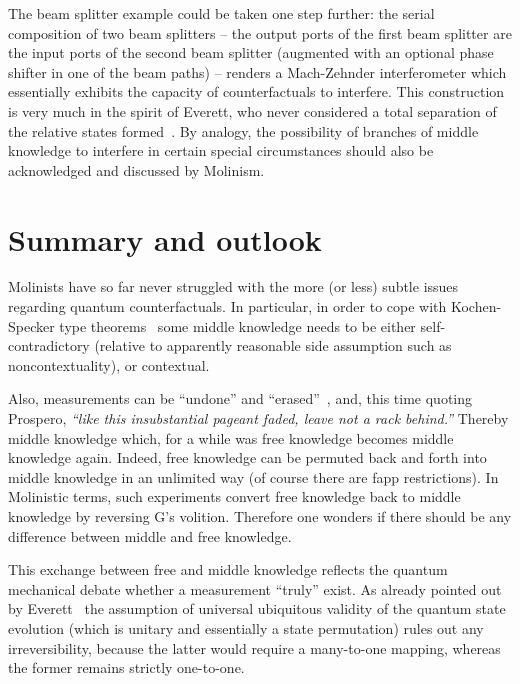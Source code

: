 \documentclass[%
  twocolumn,
 showpacs,
 showkeys,
 preprintnumbers,
 amsmath,amssymb,
 aps,
  pra,
  longbibliography,
 ]{revtex4-1}
\begin{document}
The beam splitter example could be taken one step further: the serial composition of two beam splitters
--
the output ports of the first beam splitter are the input ports of the second beam splitter
(augmented with an optional phase shifter in one of the beam paths)
--
renders a Mach-Zehnder interferometer which essentially exhibits the capacity of
counterfactuals to interfere. This construction is very much in the spirit of Everett,
who never considered a total separation of the relative states
formed~\cite{sep-qm-everett}.
By analogy, the possibility of branches of middle knowledge to interfere in certain special circumstances should also be acknowledged and discussed by Molinism.




\section{Summary and outlook}

Molinists have so far never struggled with the more (or less) subtle issues regarding quantum counterfactuals.
In particular, in order to cope with Kochen-Specker type theorems~\cite{kochen1,peres222,pitowsky:218,2015-AnalyticKS}
some middle knowledge needs to be either self-contradictory (relative to apparently reasonable side assumption such as noncontextuality),
or contextual.

Also, measurements can be ``undone'' and
``erased''~\cite{PhysRevD.22.879,PhysRevA.25.2208,greenberger2,Nature351,Zajonc-91,PhysRevA.45.7729,PhysRevLett.73.1223,PhysRevLett.75.3783,hkwz},
and, this time quoting Prospero, {\em ``like this insubstantial pageant faded,
leave not a rack behind.''}
Thereby middle knowledge which, %
for a while was free knowledge becomes middle knowledge again.
Indeed, free knowledge can be permuted back and forth into middle knowledge in an unlimited way (of course there are fapp restrictions).
In Molinistic terms, such experiments convert free knowledge back to middle knowledge by reversing G's volition.
Therefore one wonders if there should be any difference between middle and free knowledge.

This exchange between free and middle knowledge reflects the quantum mechanical debate whether  a measurement ``truly'' exist.
As already pointed out by Everett~\cite{everett}
the assumption of universal ubiquitous validity of the quantum state evolution (which is unitary and essentially a state permutation)
rules out any irreversibility, because the latter would require a many-to-one mapping, whereas the former remains strictly one-to-one.
\end{document}
